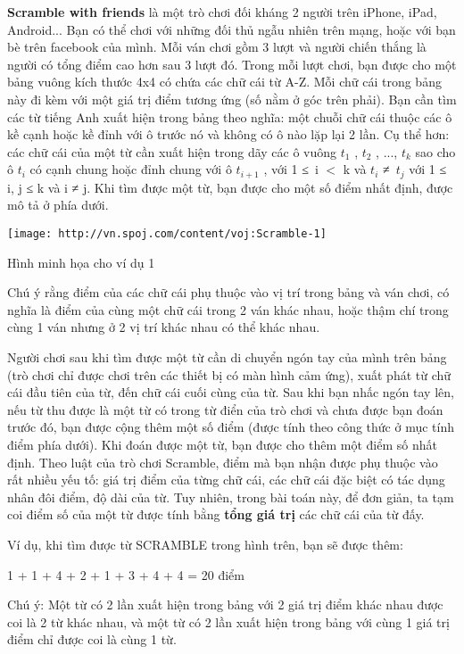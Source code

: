 \textbf{Scramble with friends } là một trò chơi đối kháng 2 người trên iPhone, iPad, Android... Bạn có thể chơi với những đối thủ ngẫu nhiên trên mạng, hoặc với bạn bè trên facebook của mình. Mỗi ván chơi gồm 3 lượt và người chiến thắng là người có tổng điểm cao hơn sau 3 lượt đó. Trong mỗi lượt chơi, bạn được cho một bảng vuông kích thước 4x4 có chứa các chữ cái từ A-Z. Mỗi chữ cái trong bảng này đi kèm với một giá trị điểm tương ứng (số nằm ở góc trên phải). Bạn cần tìm các từ tiếng Anh xuất hiện trong bảng theo nghĩa: một chuỗi chữ cái thuộc các ô kề cạnh hoặc kề đỉnh với ô trước nó và không có ô nào lặp lại 2 lần. Cụ thể hơn: các chữ cái của một từ cần xuất hiện trong dãy các ô vuông $t_{1}$ , $t_{2}$ , ..., $t_{k}$ sao cho ô $t_{i}$ có cạnh chung hoặc đỉnh chung với ô $t_{i+1}$ , với 1 ≤ i $<$ k và $t_{i}$ ≠ $t_{j}$ với 1 ≤ i, j ≤ k và i ≠ j. Khi tìm được một từ, bạn được cho một số điểm nhất định, được mô tả ở phía dưới.


\texttt{[image: http://vn.spoj.com/content/voj:Scramble-1]}

Hình minh họa cho ví dụ 1

Chú ý rằng điểm của các chữ cái phụ thuộc vào vị trí trong bảng và ván chơi, có nghĩa là điểm của cùng một chữ cái trong 2 ván khác nhau, hoặc thậm chí trong cùng 1 ván nhưng ở 2 vị trí khác nhau có thể khác nhau.

Người chơi sau khi tìm được một từ cần di chuyển ngón tay của mình trên bảng (trò chơi chỉ được chơi trên các thiết bị có màn hình cảm ứng), xuất phát từ chữ cái đầu tiên của từ, đến chữ cái cuối cùng của từ. Sau khi bạn nhấc ngón tay lên, nếu từ thu được là một từ có trong từ điển của trò chơi và chưa được bạn đoán trước đó, bạn được cộng thêm một số điểm (được tính theo công thức ở mục tính điểm phía dưới).
Khi đoán được một từ, bạn được cho thêm một điểm số nhất định. Theo luật của trò chơi Scramble, điểm mà bạn nhận được phụ thuộc vào rất nhiều yếu tố: giá trị điểm của từng chữ cái, các chữ cái đặc biệt có tác dụng nhân đôi điểm, độ dài của từ. Tuy nhiên, trong bài toán này, để đơn giản, ta tạm coi điểm số của một từ được tính bằng \textbf{ tổng giá trị } các chữ cái của từ đấy.

Ví dụ, khi tìm được từ SCRAMBLE trong hình trên, bạn sẽ được thêm:

1 + 1 + 4 + 2 + 1 + 3 + 4 + 4 = 20 điểm

Chú ý: Một từ có 2 lần xuất hiện trong bảng với 2 giá trị điểm khác nhau được coi là 2 từ khác nhau, và một từ có 2 lần xuất hiện trong bảng với cùng 1 giá trị điểm chỉ được coi là cùng 1 từ.

